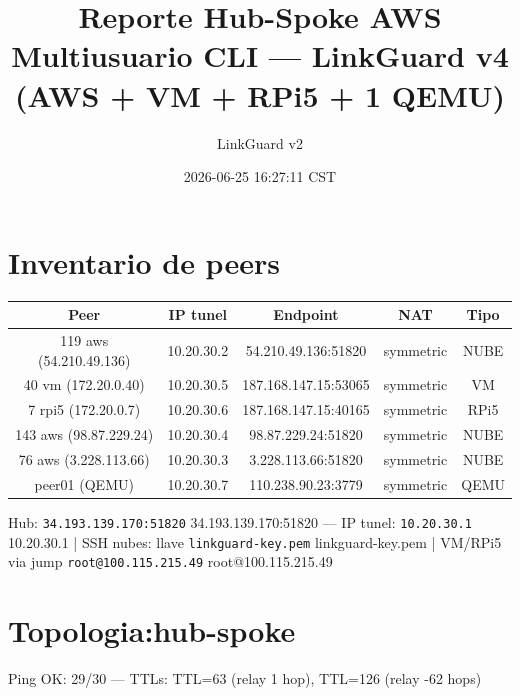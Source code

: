 \documentclass[11pt,a4paper]{article}
\title{Reporte Hub-Spoke AWS Multiusuario CLI — LinkGuard v4 (AWS + VM + RPi5 + 1 QEMU)}
\author{LinkGuard v2}
\date{2026-06-25 16:27:11 CST}
\begin{document}
\maketitle

\section{Inventario de peers}
\begin{longtable}{|c|c|c|c|c|}
\hline
Peer & IP tunel & Endpoint & NAT & Tipo \\ \hline
119 aws (54.210.49.136) & 10.20.30.2 & 54.210.49.136:51820 & symmetric & NUBE \\ \hline
40 vm (172.20.0.40) & 10.20.30.5 & 187.168.147.15:53065 & symmetric & VM \\ \hline
7 rpi5 (172.20.0.7) & 10.20.30.6 & 187.168.147.15:40165 & symmetric & RPi5 \\ \hline
143 aws (98.87.229.24) & 10.20.30.4 & 98.87.229.24:51820 & symmetric & NUBE \\ \hline
76 aws (3.228.113.66) & 10.20.30.3 & 3.228.113.66:51820 & symmetric & NUBE \\ \hline
peer01 (QEMU) & 10.20.30.7 & 110.238.90.23:3779 & symmetric & QEMU \\ \hline
\end{longtable}

Hub:  \texttt{34.193.139.170:51820} 34.193.139.170:51820  — IP tunel:  \texttt{10.20.30.1} 10.20.30.1  | SSH nubes: llave  \texttt{linkguard-key.pem} linkguard-key.pem  | VM/RPi5 via jump  \texttt{root@100.115.215.49} root@100.115.215.49\\

\section{Topologia:hub-spoke}
Ping OK: 29/30 — TTLs: TTL=63 (relay 1 hop), TTL=126 (relay -62 hops)\\
\end{document}
